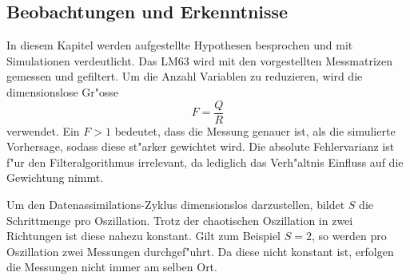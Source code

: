 \begin{refsection}
\section{Beobachtungen und Erkenntnisse}
In diesem Kapitel werden aufgestellte Hypothesen besprochen und mit Simulationen verdeutlicht. Das LM63 wird mit den vorgestellten Messmatrizen gemessen und gefiltert. Um die Anzahl Variablen zu reduzieren, wird die dimensionslose Gr"osse
\[
F=\frac{Q}{R}
\]
verwendet. Ein $F>1$ bedeutet, dass die Messung genauer ist, als die simulierte Vorhersage, sodass diese st"arker gewichtet wird. Die absolute Fehlervarianz ist f"ur den Filteralgorithmus irrelevant, da lediglich das Verh"altnis Einfluss auf die Gewichtung nimmt.

Um den Datenassimilations-Zyklus dimensionslos darzustellen, bildet $S$ die Schrittmenge pro Oszillation. Trotz der chaotischen Oszillation in zwei Richtungen ist diese nahezu konstant. Gilt zum Beispiel $S=2$, so werden pro Oszillation zwei Messungen durchgef"uhrt. Da diese nicht konstant ist, erfolgen die Messungen nicht immer am selben Ort.


\end{refsection}
